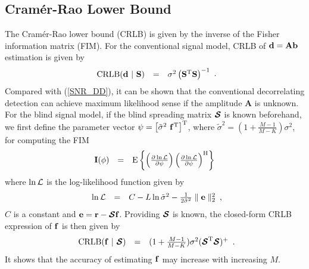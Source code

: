 \documentclass[a4paper,10pt,fleqn, twocolumn]{IEEETran}
\newcommand{\br}{{\mathbf r}}
\newcommand{\bA}{{\mathbf A}}
\newcommand{\bb}{{\bf b}}
\newcommand{\bd}{{\bf d}}
\newcommand{\bbf}{{\bf f}}
\newcommand{\bS}{{\bf S}}
\newcommand{\bI}{{\bf I}}
\newcommand{\bcS}{{\mbox {\boldmath ${\cal S}$}}}
\begin{document}
\subsection{Cram\'{e}r-Rao Lower Bound} The Cram\'{e}r-Rao lower
bound (CRLB) is given by the inverse of the Fisher information
matrix (FIM). For the conventional signal model, CRLB of
$\bd=\bA\bb$ estimation is given by
\begin{equation}
\begin{array}{rcl}
{\rm CRLB}(\bd\ |\ \bS)&=&\sigma^{2}\left(\bS^{\rm
T}\bS\right)^{\rm -1}
\end{array}.\label{CRLB_b}
\end{equation}
\noindent Compared with (\ref{SNR_DD}), it can be shown that the
conventional decorrelating detection can achieve maximum
likelihood sense if the amplitude $\bA$ is unknown. For the blind
signal model, if the blind spreading matrix $\bcS$ is known
beforehand, we first define the parameter vector $\mathbf{\psi} =
\left[\tilde{\sigma}^{2}\ \bbf^{\rm T}\right]^{\rm T}$, where
$\tilde{\sigma}^{2} =(1+\frac{M-1}{M-K})\sigma^{2}$, for computing
the FIM
\begin{equation}
\begin{array}{rcl}
{\bI(\mathbf{\phi})} &=& {\rm E} \left\{ \left( \frac{\partial
\ln{\cal L}}{\partial \mathbf{\psi}} \right) \left( \frac{\partial
\ln{\cal L}}{\partial \mathbf{\psi}} \right)^{\rm H} \right\}
\label{fim}
\end{array}
\end{equation}
\noindent where $\ln{\cal L}$ is the log-likelihood function given
by
\begin{equation}
\begin{array}{rcl}
\ln{\cal
L}&=&C-L\ln\tilde{\sigma}^2-\frac{1}{2\tilde{\sigma}^2}\parallel\mathbf{e}\parallel_2^2
\end{array},\label{logl}
\end{equation}
\noindent $C$ is a constant and $\mathbf{e}=\br-\bcS\bbf$.
Providing $\bcS$ is known, the closed-form CRLB expression of
$\bbf$ is then given by
\begin{equation}
\begin{array}{rcl}
{\rm CRLB}(\bbf\ |\ \bcS) &
=&(1+\frac{M-1}{M-K})\sigma^{2}(\bcS^{\rm T}\bcS)^{\rm +}
\end{array}.\label{CRLB_f}
\end{equation}
\noindent It shows that the accuracy of estimating $\bbf$ may
increase with increasing $M$.
\end{document}
